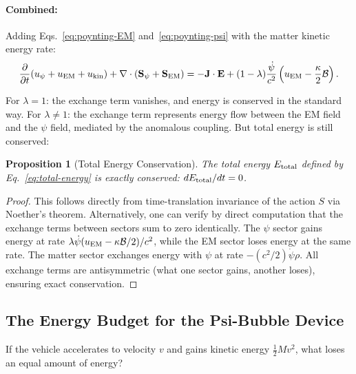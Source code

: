 \documentclass[aps,prd,twocolumn,superscriptaddress,floatfix,nofootinbib]{revtex4-2}
\newcommand{\lam}{\lambda}
\newcommand{\kap}{\kappa}
\newcommand{\calB}{\mathcal{B}}
\newtheorem{proposition}{Proposition}
\begin{document}
\paragraph{Combined:} Adding Eqs.~\eqref{eq:poynting-EM}
and~\eqref{eq:poynting-psi} with the matter kinetic energy rate:
\begin{equation}
\frac{\partial}{\partial t}(u_\psi + u_{\rm EM} + u_{\rm kin})
+ \nabla\cdot(\mathbf{S}_\psi + \mathbf{S}_{\rm EM})
= -\mathbf{J}\cdot\mathbf{E}
+ (1-\lam)\frac{\dot\psi}{c^2}\left(u_{\rm EM}
- \frac{\kap}{2}\calB\right).
\label{eq:combined-energy}
\end{equation}

For $\lam = 1$: the exchange term vanishes, and energy is conserved
in the standard way. For $\lam \neq 1$: the exchange term represents
energy flow between the EM field and the $\psi$ field, mediated by the
anomalous coupling. But total energy is still conserved:

\begin{proposition}[Total Energy Conservation]
The total energy $E_{\rm total}$ defined by
Eq.~\eqref{eq:total-energy} is exactly conserved:
$dE_{\rm total}/dt = 0$.
\end{proposition}

\begin{proof}
This follows directly from time-translation invariance of the action
$S$ via Noether's theorem. Alternatively, one can verify by direct
computation that the exchange terms between sectors sum to zero
identically. The $\psi$ sector gains energy at rate
$\lam\dot\psi(u_{\rm EM} - \kap\calB/2)/c^2$, while the EM sector
loses energy at the same rate. The matter sector exchanges energy
with $\psi$ at rate $-(c^2/2)\dot\psi\rho$. All exchange terms are
antisymmetric (what one sector gains, another loses), ensuring exact
conservation.
\end{proof}

\subsection{The Energy Budget for the Psi-Bubble Device}
\label{sec:energy-budget}

\begin{tcolorbox}[colback=green!5!white, colframe=green!60!black,
title=Critical Question: Where Does the Kinetic Energy Come From?]
If the vehicle accelerates to velocity $v$ and gains kinetic energy
$\frac{1}{2}Mv^2$, what loses an equal amount of energy?
\end{tcolorbox}
\end{document}
